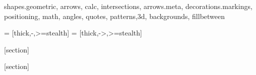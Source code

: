 \rfoot{\small{\textbf{
}}}
\pagestyle{fancy}

\newcommand{\Vector}[1]{\underline{\mathbf{#1}}}%
\newcommand{\Matrix}[1]{\underline{\underline{{\mathbf{#1}}}}}

\newcommand{\Result}[1]{\underline{\underline{~~#1~~}}}
\newcommand{\Wronsky}[2]
{
   \left|\begin{array}{cc}
      #1(t)  & #2(t)\\
      #1'(t) & #2'(t)
   \end{array}\right|
}
\newcommand{\IntegralZero}[2]
{
   \int \frac{1}{#1(t)^2} e^{-#2(t) } dt
}
\newcommand{\Integral}[3]
{
   \int \frac{#1(t) #2(t) }{#3(t)} dt
}
\usepackage{pgfplots}
\pgfplotsset{compat=1.8}
\usepackage{tikz}
\usepackage{tkz-euclide}
\usetikzlibrary
    {
      shapes.geometric,
      arrows,
      calc,
      intersections,
      arrows.meta,
      decorations.markings,
      positioning,
      math,
      angles,
      quotes,
      patterns,3d,
      backgrounds,
      fillbetween
    }

\usepackage{chessboard}
\usepackage{skak}

\makeatletter
\newcommand{\gettikzxy}[3]{%
  \tikz@scan@one@point\pgfutil@firstofone#1\relax
  \edef#2{\the\pgf@x}%
  \edef#3{\the\pgf@y}%
  \pgfmathparse{#2/28.4527} \let#2\pgfmathresult;
  \pgfmathparse{#3/28.4527} \let#3\pgfmathresult;
}
\makeatother



 = [thick,-,>=stealth]
 = [thick,->,>=stealth]

\usepackage{scrextend}

[section]
\newcommand{\Example}[2]{
   \begin{small}
   \stepcounter{Example}
   \label{item:\theExample}
   \small{\underline{\textbf{\textit{Exemplo \thesection.\theExample:}}} #1
     \begin{addmargin}[1em]{2em}%
       #2
     \end{addmargin}
   }
   \end{small}
}

[section]
\newcommand{\MyExercise}[1]{
   \stepcounter{Exercise}
   \label{exercise:\thesection:\theExercise}
   \textbf{Exercício \thesection.\theExercise}.
   \begin{addmargin}[1em]{2em}
      \begin{small}\end{small}
   \end{addmargin}
}

